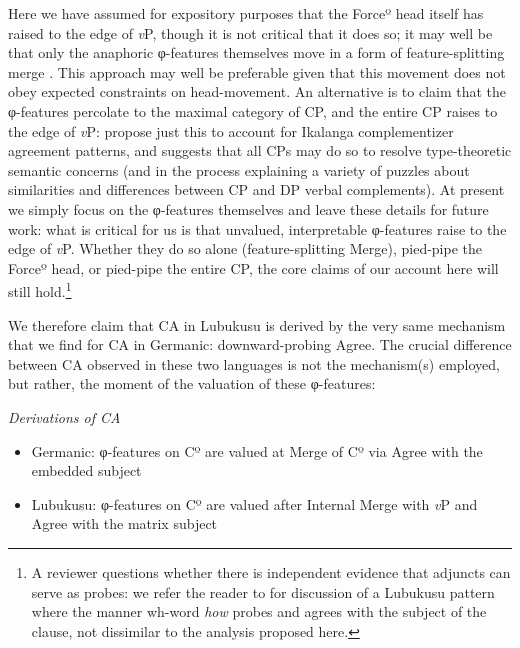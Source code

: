 \documentclass[output=paper
,modfonts
,nonflat
]{langsci/langscibook}
\begin{document}
\noindent Here we have assumed for expository purposes that the Forceº head itself has raised to the edge of \textit{v}P, though it is not critical that it does so; it may well be that only the anaphoric φ-features themselves move in a form of feature-splitting merge \citep{Obata:2011}. This approach may well be preferable given that this movement does not obey expected constraints on head-movement. An alternative is to claim that the φ-features percolate to the maximal category of CP, and the entire CP raises to the edge of \textit{v}P: \citet{LetsholoSafir:2017} propose just this to account for Ikalanga complementizer agreement patterns, and \citet{Moulton:2015} suggests that all CPs may do so to resolve type-theoretic semantic concerns (and in the process explaining a variety of puzzles about similarities and differences between CP and DP verbal complements). At present we simply focus on the φ-features themselves and leave these details for future work: what is critical for us is that unvalued, interpretable φ-features raise to the edge of \textit{v}P. Whether they do so alone (feature-splitting Merge), pied-pipe the Forceº head, or pied-pipe the entire CP, the core claims of our account here will still hold.\footnote{A reviewer questions whether there is independent evidence that adjuncts can serve as probes: we refer the reader to \citet{CarstensDiercks:2013} for discussion of a Lubukusu pattern where the manner wh-word \textit{how} probes and agrees with the subject of the clause, not dissimilar to the analysis proposed here.}\largerpage 

We therefore claim that CA in Lubukusu is derived by the very same mechanism that we find for CA in Germanic: downward-probing Agree. The crucial difference between CA observed in these two languages is not the mechanism(s) employed, but rather, the moment of the valuation of these φ-features:


\ea \textit{Derivations of CA}
\begin{itemize}
\item Germanic: φ-features on Cº are valued at Merge of Cº via Agree with the embedded subject
\item Lubukusu: φ-features on Cº are valued after Internal Merge with \textit{v}P and Agree with the matrix subject
\end{itemize}
\z
\end{document}
